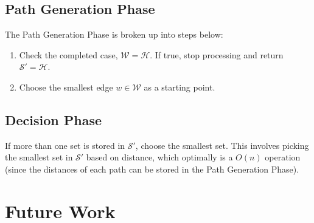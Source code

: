 \documentclass[12pt]{article}
\begin{document}
\subsection{Path Generation Phase}\label{subsec:path-gen}
The Path Generation Phase is broken up into steps below:
\begin{enumerate}
\item Check the completed case, $\mathcal{W} = \mathcal{H}$.
If true, stop processing and return $\mathcal{S}' = \mathcal{H}$.
\item Choose the smallest edge $w \in \mathcal{W}$ as a starting point.
\end{enumerate}

\subsection{Decision Phase}\label{subsec:decision}
If more than one set is stored in $\mathcal{S}'$, choose the smallest set.
This involves picking the smallest set in $\mathcal{S}'$ based on distance,
which optimally is a $O(n)$ operation (since the distances of each path can be stored
in the Path Generation Phase).

\section{Future Work}\label{sec:future}
\end{document}
